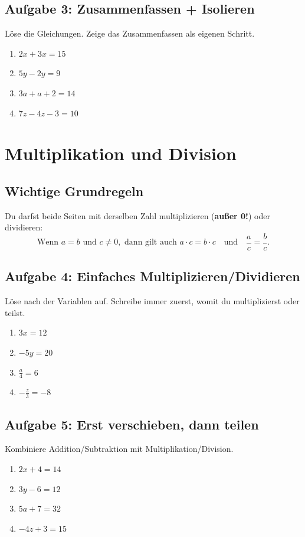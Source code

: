 \documentclass[12pt]{article}
\begin{document}
\subsection*{Aufgabe 3: Zusammenfassen + Isolieren}
Löse die Gleichungen. Zeige das Zusammenfassen als eigenen Schritt.
\begin{enumerate}
  \item \(2x + 3x = 15\)
  \item \(5y - 2y = 9\)
  \item \(3a + a + 2 = 14\)
  \item \(7z - 4z - 3 = 10\)
\end{enumerate}

\section*{Multiplikation und Division}

\subsection*{Wichtige Grundregeln}
Du darfst beide Seiten mit derselben Zahl multiplizieren (\textbf{außer 0!}) oder dividieren:
\[
  \text{Wenn } a = b \text{ und } c \neq 0, \text{ dann gilt auch } a \cdot c = b \cdot c \quad \text{und} \quad \frac{a}{c} = \frac{b}{c}.
\]

\subsection*{Aufgabe 4: Einfaches Multiplizieren/Dividieren}
Löse nach der Variablen auf. Schreibe immer zuerst, womit du multiplizierst oder teilst.
\begin{enumerate}
  \item \(3x = 12\)
  \item \(-5y = 20\)
  \item \(\frac{a}{4} = 6\)
  \item \(-\frac{z}{3} = -8\)
\end{enumerate}

\subsection*{Aufgabe 5: Erst verschieben, dann teilen}
Kombiniere Addition/Subtraktion mit Multiplikation/Division.
\begin{enumerate}
  \item \(2x + 4 = 14\)
  \item \(3y - 6 = 12\)
  \item \(5a + 7 = 32\)
  \item \(-4z + 3 = 15\)
\end{enumerate}
\end{document}
